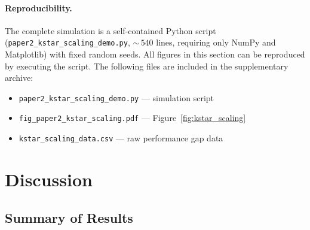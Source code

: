 \documentclass[12pt]{article}
\begin{document}
\paragraph{Reproducibility.}
\begin{sloppypar}
The complete simulation is a self-contained Python script
(\texttt{paper2\_kstar\_scaling\_demo.py}, ${\sim}\,540$
lines, requiring only NumPy and Matplotlib) with fixed
random seeds.  All figures in this section can be
reproduced by executing the script.  The following files
are included in the supplementary archive:
\begin{itemize}
\item \texttt{paper2\_kstar\_scaling\_demo.py} --- simulation script
\item \texttt{fig\_paper2\_kstar\_scaling.pdf} --- Figure~\ref{fig:kstar_scaling}
\item \texttt{kstar\_scaling\_data.csv} --- raw performance gap data
\end{itemize}
\end{sloppypar}

\section{Discussion}
\label{sec:discussion}

\subsection{Summary of Results}
\label{subsec:summary}
\end{document}
